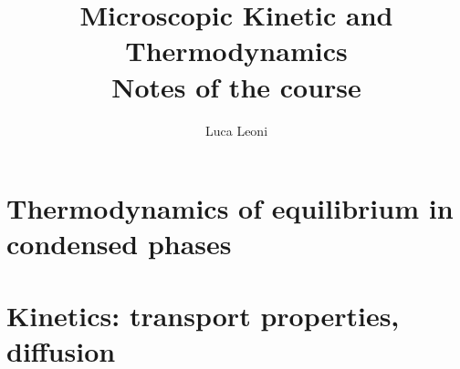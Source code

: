 \documentclass[12pt]{report}
\title{\Huge{Microscopic Kinetic and Thermodynamics}\\Notes of the course}
\author{\huge{Luca Leoni}}
\date{}
\begin{document}
    \maketitle

    \tableofcontents

    \chapter{Thermodynamics of equilibrium in condensed phases}
    
    
    
    

    \chapter{Kinetics: transport properties, diffusion}
    
    
\end{document}
